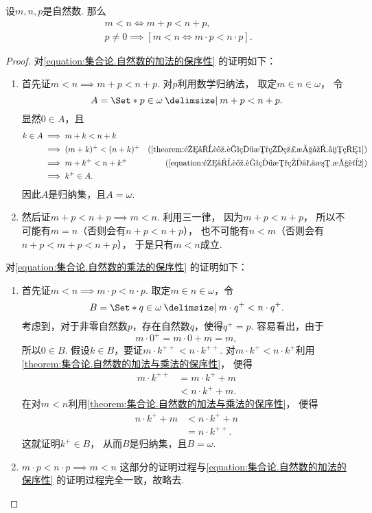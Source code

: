 \begin{theorem}\label{theorem:集合论.自然数的加法与乘法的保序性}
设\(m,n,p\)是自然数.
那么\begin{gather}
	m < n \iff m + p < n + p,
	\label{equation:集合论.自然数的加法的保序性} \\
	p \neq 0 \implies [m < n \iff m \cdot p < n \cdot p].
	\label{equation:集合论.自然数的乘法的保序性}
\end{gather}
\begin{proof}
对\cref{equation:集合论.自然数的加法的保序性} 的证明如下：
\begin{enumerate}
	\item 首先证\(m < n \implies m + p < n + p\).
	对\(p\)利用数学归纳法，
	取定\(m \in n \in \omega\)，
	令\[
		A = \Set*{
			p \in \omega
			\given
			m + p < n + p
		}.
	\]
	显然\(0 \in A\)，且\begin{align*}
		k \in A
		&\implies m+k<n+k \\
		&\implies (m+k)^+<(n+k)^+
			&(\text{\cref{theorem:集合论.自然数的线性序.引理1}}) \\
		&\implies m+k^+<n+k^+
			&(\text{\cref{equation:集合论.自然数的加法.性质2}}) \\
		&\implies k^+ \in A.
	\end{align*}
	因此\(A\)是归纳集，且\(A = \omega\).

	\item 然后证\(m + p < n + p \implies m < n\).
	利用三一律，
	因为\(m + p < n + p\)，
	所以不可能有\(m = n\)（否则会有\(n+p<n+p\)），
	也不可能有\(n < m\)（否则会有\(n+p<m+p<n+p\)），
	于是只有\(m < n\)成立.
\end{enumerate}

对\cref{equation:集合论.自然数的乘法的保序性} 的证明如下：
\begin{enumerate}
	\item 首先证\(m < n \implies m \cdot p < n \cdot p\).
	取定\(m \in n \in \omega\)，令\[
		B = \Set*{
			q \in \omega
			\given
			m \cdot q^+ < n \cdot q^+
		}.
	\]
	考虑到，对于非零自然数\(p\)，存在自然数\(q\)，使得\(q^+ = p\).
	容易看出，由于\[
		m \cdot 0^+ = m \cdot 0 + m = m,
	\]
	所以\(0 \in B\).
	假设\(k \in B\)，要证\(m \cdot k^{++} < n \cdot k^{++}\).
	对\(m \cdot k^+ < n \cdot k^+\)利用\cref{theorem:集合论.自然数的加法与乘法的保序性}，
	便得\begin{align*}
		m \cdot k^{++}
		&= m \cdot k^+ + m \\
		&< n \cdot k^+ + m.
	\end{align*}
	在对\(m < n\)利用\cref{theorem:集合论.自然数的加法与乘法的保序性}，
	便得\begin{align*}
		n \cdot k^+ + m
		&< n \cdot k^+ + n \\
		&= n \cdot k^{++}.
	\end{align*}
	这就证明\(k^+ \in B\)，
	从而\(B\)是归纳集，且\(B = \omega\).

	\item \(m \cdot p < n \cdot p \implies m < n\)%
	这部分的证明过程与\cref{equation:集合论.自然数的加法的保序性} 的证明过程完全一致，故略去.
	\qedhere
\end{enumerate}
\end{proof}
\end{theorem}

